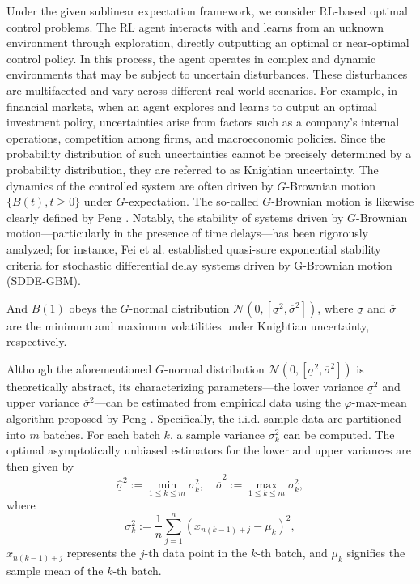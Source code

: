 \documentclass[onecolumn, journal]{IEEEtran} %
\begin{document}
	Under the given sublinear expectation framework, we consider RL-based optimal control problems. The RL agent interacts with and learns from an unknown environment through exploration, directly outputting an optimal or near-optimal control policy. In this process, the agent operates in complex and dynamic environments that may be subject to uncertain disturbances. These disturbances are multifaceted and vary across different real-world scenarios. For example, in financial markets, when an agent explores and learns to output an optimal investment policy, uncertainties arise from factors such as a company’s internal operations, competition among firms, and macroeconomic policies. Since the probability distribution of such uncertainties cannot be precisely determined by a probability distribution, they are referred to as Knightian uncertainty. The dynamics of the controlled system are often driven by $G$-Brownian motion $\{ B(t), t \geq 0 \}$ under $G$-expectation. The so-called $G$-Brownian motion is likewise clearly defined by Peng \cite{peng2010nonlinear}. Notably, the stability of systems driven by $G$-Brownian motion—particularly in the presence of time delays—has been rigorously analyzed; for instance, Fei et al. \cite{fei2025quasi} established quasi-sure exponential stability criteria for stochastic differential delay systems driven by G-Brownian motion (SDDE-GBM).
	
	And $B(1)$ obeys the $G$-normal distribution $\mathcal{N}(0, [\underline{\sigma}^2, \overline{\sigma}^2])$, where $\underline{\sigma}$ and $\overline{\sigma}$ are the minimum and maximum volatilities under Knightian uncertainty, respectively.
	
	Although the aforementioned $G$-normal distribution $\mathcal{N}(0, [\underline{\sigma}^2, \overline{\sigma}^2])$ is theoretically abstract, its characterizing parameters---the lower variance $\underline{\sigma}^2$ and upper variance $\overline{\sigma}^2$---can be estimated from empirical data using the $\varphi$-max-mean algorithm proposed by Peng \cite{peng2017}. Specifically, the i.i.d. sample data are partitioned into $m$ batches. For each batch $k$, a sample variance $\sigma_k^2$ can be computed. The optimal asymptotically unbiased estimators for the lower and upper variances are then given by
	\[
	\hat{\underline{\sigma}}^2 := \min_{1 \leq k \leq m} \sigma_k^2, \quad \hat{\overline{\sigma}}^2 := \max_{1 \leq k \leq m} \sigma_k^2,
	\]
	where
	\[
	\sigma_k^2 := \frac{1}{n} \sum_{j=1}^{n} (x_{n(k-1)+j} - \mu_k)^2,
	\]
	$x_{n(k-1)+j}$ represents the $j$-th data point in the $k$-th batch, and $\mu_k$ signifies the sample mean of the $k$-th batch.
	
\end{document}
